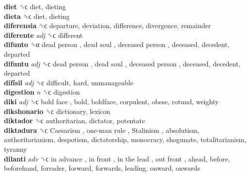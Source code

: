 \textbf{diet} ␝ϲ  diet, dieting  \\
\textbf{dieta} ␝ϲ  diet, dieting  \\
\textbf{diferensia} ␝ϲ  departure, deviation, difference, divergence, remainder  \\
\textbf{diferente} \emph{adj}  ␝ϲ  different  \\
\textbf{difunto} ␝α   dead person ,  dead soul ,  deceased person , deceased, decedent, departed  \\
\textbf{difuntu} \emph{adj}  ␝ϲ   dead person ,  dead soul ,  deceased person , deceased, decedent, departed  \\
\textbf{difísil} \emph{adj}  ␝ϲ  difficult, hard, unmanageable  \\
\textbf{digestion} \emph{n}  ␝ϲ  digestion  \\
\textbf{diki} \emph{adj}  ␝ϲ   bold face , bold, boldface, corpulent, obese, rotund, weighty  \\
\textbf{dikshonario} ␝ϲ  dictionary, lexicon  \\
\textbf{diktador} ␝ϲ  authoritarian, dictator, potentate  \\
\textbf{diktadura} ␝ϲ   Caesarism ,  one-man rule ,  Stalinism , absolutism, authoritarianism, despotism, dictatorship, monocracy, shogunate, totalitarianism, tyranny  \\
\textbf{dilanti} \emph{adv}  ␝ϲ   in advance ,  in front ,  in the lead ,  out front , ahead, before, beforehand, forrader, forward, forwards, leading, onward, onwards  \\
